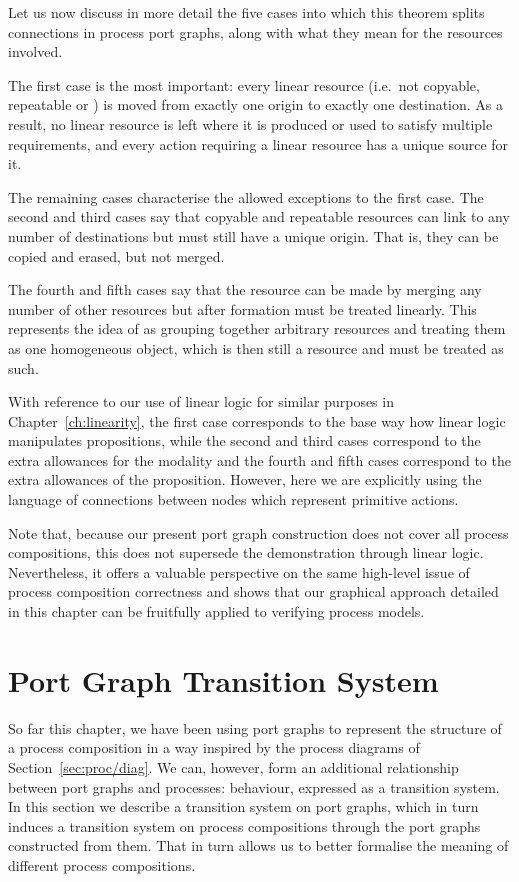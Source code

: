 \documentclass[class=smolathesis,crop=false]{standalone}
\begin{document}
Let us now discuss in more detail the five cases into which this theorem splits connections in process port graphs, along with what they mean for the resources involved.

The first case is the most important: every linear resource (i.e.\ not copyable, repeatable or ) is moved from exactly one origin to exactly one destination.
As a result, no linear resource is left where it is produced or used to satisfy multiple requirements, and every action requiring a linear resource has a unique source for it.

The remaining cases characterise the allowed exceptions to the first case.
The second and third cases say that copyable and repeatable resources can link to any number of destinations but must still have a unique origin.
That is, they can be copied and erased, but not merged.

The fourth and fifth cases say that the  resource can be made by merging any number of other resources but after formation must be treated linearly.
This represents the idea of  as grouping together arbitrary resources and treating them as one homogeneous object, which is then still a resource and must be treated as such.

With reference to our use of linear logic for similar purposes in Chapter~\ref{ch:linearity}, the first case corresponds to the base way how linear logic manipulates propositions, while the second and third cases correspond to the extra allowances for the \isa{\isacharbang} modality and the fourth and fifth cases correspond to the extra allowances of the \isa{\isasymbottom} proposition.
However, here we are explicitly using the language of connections between nodes which represent primitive actions.

Note that, because our present port graph construction does not cover all process compositions, this does not supersede the demonstration through linear logic.
Nevertheless, it offers a valuable perspective on the same high-level issue of process composition correctness and shows that our graphical approach detailed in this chapter can be fruitfully applied to verifying process models.

\section{Port Graph Transition System}
\label{sec:port_graphs/trans}

So far this chapter, we have been using port graphs to represent the structure of a process composition in a way inspired by the process diagrams of Section~\ref{sec:proc/diag}.
We can, however, form an additional relationship between port graphs and processes: behaviour, expressed as a transition system.
In this section we describe a transition system on port graphs, which in turn induces a transition system on process compositions through the port graphs constructed from them.
That in turn allows us to better formalise the meaning of different process compositions.
\end{document}
